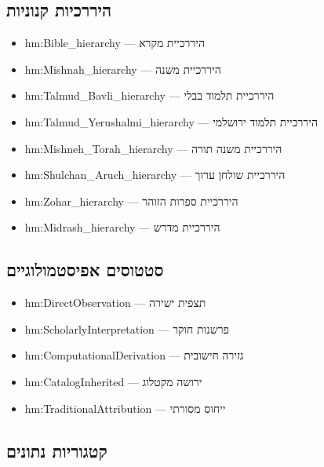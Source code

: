 \documentclass[12pt,a4paper]{article}
\newcommand{\new}[1]{\textcolor{newaddition}{#1}}
\begin{document}
\subsection{\new{היררכיות קנוניות}}

\begin{itemize}
\item \new{hm:Bible\_hierarchy — היררכיית מקרא}
\item \new{hm:Mishnah\_hierarchy — היררכיית משנה}
\item \new{hm:Talmud\_Bavli\_hierarchy — היררכיית תלמוד בבלי}
\item \new{hm:Talmud\_Yerushalmi\_hierarchy — היררכיית תלמוד ירושלמי}
\item \new{hm:Mishneh\_Torah\_hierarchy — היררכיית משנה תורה}
\item \new{hm:Shulchan\_Aruch\_hierarchy — היררכיית שולחן ערוך}
\item \new{hm:Zohar\_hierarchy — היררכיית ספרות הזוהר}
\item \new{hm:Midrash\_hierarchy — היררכיית מדרש}
\end{itemize}

\subsection{\new{סטטוסים אפיסטמולוגיים}}

\begin{itemize}
\item \new{hm:DirectObservation — תצפית ישירה}
\item \new{hm:ScholarlyInterpretation — פרשנות חוקר}
\item \new{hm:ComputationalDerivation — גזירה חישובית}
\item \new{hm:CatalogInherited — ירושה מקטלוג}
\item \new{hm:TraditionalAttribution — ייחוס מסורתי}
\end{itemize}

\subsection{\new{קטגוריות נתונים}}
\end{document}
